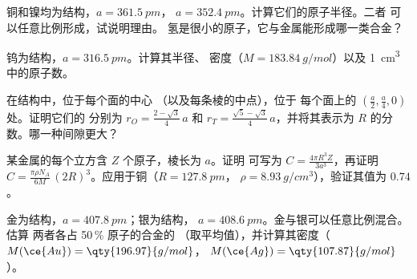 \begin{exercise}[$\star\star$]\label{exo:b1:crystals-metals:8}
铜和镍均为结构，$a = \qty{361.5}{pm}$，
$a = \qty{352.4}{pm}$。计算它们的原子半径。二者
可以任意比例形成，试说明理由。
氢是很小的原子，它与金属能形成哪一类合金？
\end{exercise}

\begin{exercise}[$\star\star$]\label{exo:b1:crystals-metals:9}
钨为结构，$a = \qty{316.5}{pm}$。计算其半径、
密度（$M = \qty{183.84}{g/mol}$）以及
\qty{1}{cm^3} 中的原子数。
\end{exercise}

\begin{exercise}[$\star\star\star$]\label{exo:b1:crystals-metals:10}
在结构中，位于每个面的中心
（以及每条棱的中点），位于
每个面上的 $(\frac{a}{2}, \frac{a}{4}, 0)$ 处。证明它们的
分别为 $r_O = \frac{2 - \sqrt3}{4}\,a$ 和
$r_T = \frac{\sqrt5 - \sqrt3}{4}\,a$，并将其表示为
$R$ 的分数。哪一种间隙更大？
\end{exercise}

\begin{exercise}[$\star\star\star$]\label{exo:b1:crystals-metals:11}
某金属的每个立方含 $Z$ 个原子，棱长为 $a$。证明
可写为 $C = \frac{4\pi R^3 Z}{3a^3}$，再证明
$C = \frac{\pi\rho N_A}{6M}\,(2R)^3$。应用于铜（$R = \qty{127.8}{pm}$，
$\rho = \qty{8.93}{g/cm^3}$），验证其值为 $0.74$。
\end{exercise}

\begin{exercise}[$\star\star\star$]\label{exo:b1:crystals-metals:12}
金为结构，$a = \qty{407.8}{pm}$；银为结构，
$a = \qty{408.6}{pm}$。金与银可以任意比例混合。估算
两者各占 50\,\% 原子的合金的
（取平均值），并计算其密度（$M(\ce{Au}) = \qty{196.97}{g/mol}$，
$M(\ce{Ag}) = \qty{107.87}{g/mol}$）。
\end{exercise}

